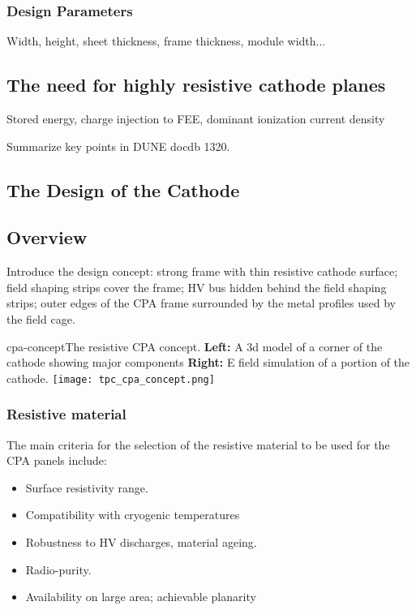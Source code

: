 \subsubsection{Design Parameters}

Width, height, sheet thickness, frame thickness, module width...


\subsection{The need for highly resistive cathode planes}
Stored energy, charge injection to FEE, dominant ionization current density

Summarize key points in DUNE docdb 1320.

\subsection{The Design of the Cathode}

\subsection{Overview}

Introduce the design concept: strong frame with thin resistive cathode surface; field shaping strips cover the frame; HV bus hidden behind the field shaping strips; outer edges of the CPA frame surrounded by the metal profiles used by the field cage.

\begin{cdrfigure}{cpa-concept}{The resistive CPA concept. 
 {\bf Left:} A 3d model of a corner of the cathode showing major components {\bf Right:} E field simulation of a portion of the cathode.} 
\texttt{[image: tpc\_cpa\_concept.png]}
\end{cdrfigure}


\subsubsection{Resistive material}

The main criteria for the selection of the resistive material to be used for the CPA panels include: 
\begin{itemize}	
\item Surface resistivity range.
\item Compatibility with cryogenic temperatures
\item Robustness to HV discharges, material ageing.
\item Radio-purity.
\item Availability on large area; achievable planarity 
\end{itemize}

